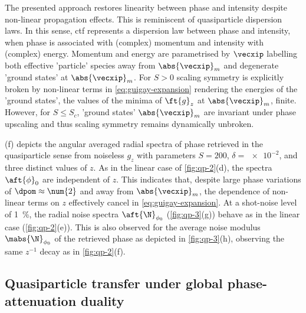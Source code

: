 \documentclass[
twoside,
openright,
titlepage,
numbers=noenddot,
headinclude,
fleqn,
a4paper,
footinclude=true,
cleardoublepage=empty,
abstractoff,
BCOR=5mm,
paper=a4,
fontsize=11pt,
british,ngerman,american,
]{scrreprt}
\begin{document}
The presented approach restores linearity between phase and intensity
despite non-linear propagation effects.  This is reminiscent of
quasiparticle dispersion laws.  In this sense, \ac{ctf} represents a
dispersion law between phase and intensity, when phase is associated
with (complex) momentum and intensity with (complex) energy.  Momentum
and energy are parametrised by $\vecxip$ labelling both effective
'particle' species away from $\abs{\vecxip}_m$ and degenerate 'ground
states' at $\abs{\vecxip}_m$.  For $S>0$ scaling symmetry is
explicitly broken by non-linear terms in \cref{eq:guigay-expansion}
rendering the energies of the 'ground states', \ie{} the values of the
minima of $\ft{g}_z$ at $\abs{\vecxip}_m$, finite.  However, for $S\le
S_c$, 'ground states' $\abs{\vecxip}_m$ are invariant under phase
upscaling and thus scaling symmetry remains dynamically unbroken.

(f) depicts the angular averaged radial spectra of
phase retrieved in the quasiparticle sense from noiseless $g_z$ with
parameters $S=\num{200}$, $\delta=\num{e-2}$, and three distinct
values of $z$.  As in the linear case of \cref{fig:qp-2}(d), the
spectra $\aft{\phi}_0$ are independent of $z$.  This indicates that,
despite large phase variations of $\dpom\approx\num{2}$ and away from
$\abs{\vecxip}_m$, the dependence of non-linear terms on $z$
effectively cancel in \cref{eq:guigay-expansion}.  At a shot-noise
level of \SI{1}{\percent}, the radial noise spectra
$\aft{\N}_{\phi_0}$ (\cref{fig:qp-3}(g)) behave as in the linear case
(\cref{fig:qp-2}(e)).  This is also observed for the average noise
modulus $\mabs{\N}_{\phi_0}$ of the retrieved phase as depicted in
\cref{fig:qp-3}(h), observing the same $z^{-1}$ decay as in
\cref{fig:qp-2}(f).

\subsection[\texorpdfstring{Quasiparticle transfer under global\\
  phase-attenuation duality}{Quasiparticle transfer under global
  phase-attenuation duality}]{Quasiparticle transfer under global
  phase-attenuation duality}
\label{sec:qp-duality}
\end{document}
